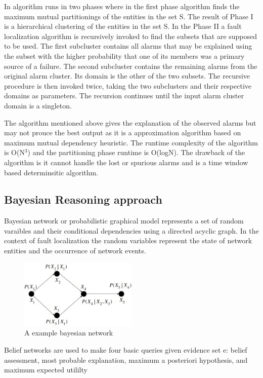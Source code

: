 \documentclass[10pt]{sigplan-proc-varsize}
\begin{document}
In algorithm runs in two phases where in the first phase algorithm finds the maximum mutual partitionings of the entities in the set S. The result of Phase I is a hierarchical clustering of the entities in the set S. In the Phase II a fault localization algorithm is recursively invoked to find the subsets that are supposed to be used. The first subcluster contains all alarms that may be explained using the subset with the higher probability that one of its members was a primary source of a failure. The second subcluster contains the remaining alarms from the original alarm cluster. Its domain is the other of the two subsets. The recursive procedure is then invoked twice, taking the two subclusters and their respective domains as parameters. The recursion continues until the input alarm cluster domain is a singleton. 

The algorithm mentioned above gives the explanation of the observed alarms but may not prouce the best output as it is a approximation algorithm based on maximum mutual dependency heuristic. The runtime complexity of the algorithm is O(N$^{3}$) and the partitioning phase runtime is O(logN). The drawback of the algorithm is it cannot handle the lost or spurious alarms and is a time window based determinsitic algorithm.

\subsection{Bayesian Reasoning approach}
Bayesian network or probabilistic graphical model represents a set of random varaibles and their conditional dependencies using a directed acyclic graph. In the context of fault localization the random variables represent the state of network entities and the occurrence of network events. 

\begin{figure}[h!]
  \caption{A example bayesian network}
  \centering
    \includegraphics[width=0.5\textwidth]{Fig6}
\end{figure}

Belief networks are used to make four basic queries given evidence set e: belief assessment, most probable explanation, maximum a posteriori hypothesis, and maximum expected utililty \cite{Pearl:98}
\end{document}

